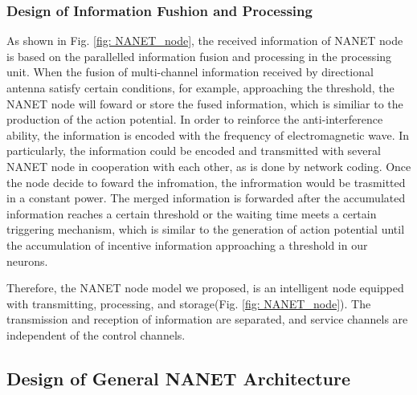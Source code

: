\documentclass[journal,comsoc]{IEEEtran}
\begin{document}
			\subsubsection{Design of Information Fushion and Processing}
				As shown in Fig. \ref{fig: NANET_node}, the received information of NANET node is based on the parallelled information fusion and processing in the processing unit.
				When the fusion of multi-channel information received by directional antenna satisfy certain conditions, for example, approaching the threshold, 
				the NANET node will foward or store the fused information, which is similiar to the production of the action potential.
				In order to reinforce the anti-interference ability, the information is encoded with the frequency of electromagnetic wave.
				In particularly, the information could be encoded and transmitted with several NANET node in cooperation with each other, as is done by network coding.
				Once the node decide to foward the infromation, the infrormation would be trasmitted in a constant power.
				The merged information is forwarded after the accumulated information reaches a certain threshold or the waiting time meets a certain triggering mechanism, 
				which is similar to the generation of action potential until the accumulation of incentive information approaching a threshold in our neurons.
				
				Therefore, the NANET node model we proposed, is an intelligent node equipped with transmitting, processing, and storage(Fig. \ref{fig: NANET_node}).
				The transmission and reception of information are separated, and service channels are independent of the control channels.
	
		\subsection{Design of General NANET Architecture}
			
\end{document}

